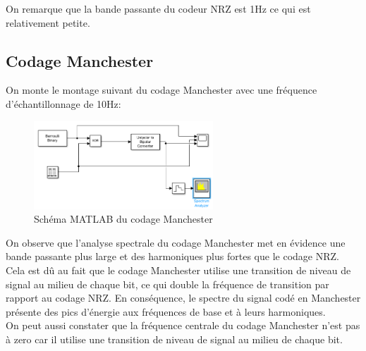 \documentclass[11pt, openright]{book}
\begin{document}
On remarque que la bande passante du codeur NRZ est 1Hz ce qui est relativement petite.

\subsection{Codage Manchester}

On monte le montage suivant du codage Manchester avec une fréquence d'échantillonnage de 10Hz:

\begin{figure}[ht!]
	\centering
	\includegraphics[width=0.6\textwidth]{./object/g4.png}
	\caption{Schéma MATLAB du codage Manchester}
\end{figure}

\begin{figure}[ht!]
	\begin{floatrow}


	\end{floatrow}
\end{figure}

On observe que l'analyse spectrale du codage Manchester met en évidence une bande passante plus large et des harmoniques plus fortes que le codage NRZ. Cela est dû au fait que le codage Manchester utilise une transition de niveau de signal au milieu de chaque bit, ce qui double la fréquence de transition par rapport au codage NRZ. En conséquence, le spectre du signal codé en Manchester présente des pics d'énergie aux fréquences de base et à leurs harmoniques. \\
On peut aussi constater que la fréquence centrale du codage Manchester n'est pas à zero car il utilise une transition de niveau de signal au milieu de chaque bit.
\end{document}
